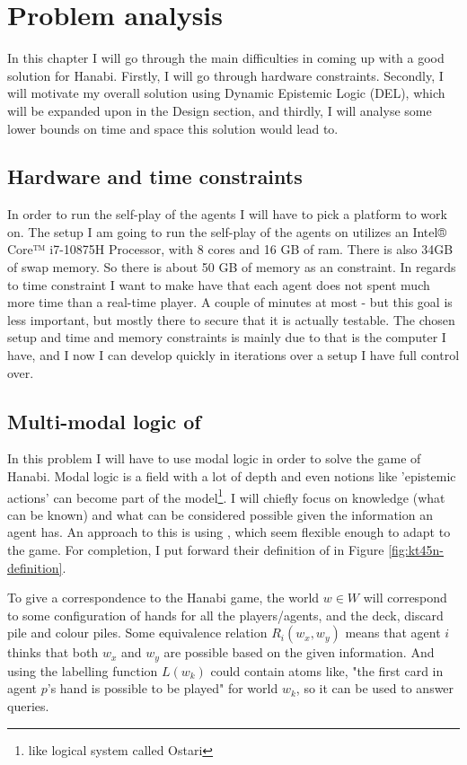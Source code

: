 \section{Problem analysis}

In this chapter I will go through the main difficulties in coming up with a good solution for Hanabi. Firstly, I will go through hardware constraints. Secondly, I will motivate my overall solution using Dynamic Epistemic Logic (DEL), which will be expanded upon in the Design section, and thirdly, I will analyse some lower bounds on time and space this solution would lead to.

\subsection{Hardware and time constraints}
In order to run the self-play of the agents I will have to pick a platform to work on.
The setup I am going to run the self-play of the agents on utilizes an Intel® Core™ i7-10875H Processor, with 8 cores and 16 GB of ram. There is also 34GB of swap memory. So there is about 50 GB of memory as an constraint.
In regards to time constraint I want to make have that each agent does not spent much more time than a real-time player. A couple of minutes at most - but this goal is less important, but mostly there to secure that it is actually testable.
The chosen setup and time and memory constraints is mainly due to that is the computer I have, and I now I can develop quickly in iterations over a setup I have full control over.

\subsection{Multi-modal logic of \SfiveN} \label{sec:definition-ktfourfiven}
In this problem I will have to use modal logic in order to solve the game of Hanabi. Modal logic is a field with a lot of depth and even notions like 'epistemic actions' can become part of the model\footnote{like \cite{EgerAndMartens17} logical system called Ostari}. I will chiefly focus on knowledge (what can be known) and what can be considered possible given the information an agent has. An approach to this is using \SfiveN{} \cite{HuthAndRyan2004KT45n}, which seem flexible enough to adapt to the game. For completion, I put forward their definition of \SfiveN{} in Figure \ref{fig:kt45n-definition}. 

To give a correspondence to the Hanabi game, the world $w \in W$ will correspond to some configuration of hands for all the players/agents, and the deck, discard pile and colour piles. Some equivalence relation $R_i(w_x,w_y)$ means that agent $i$ thinks that both $w_x$ and $w_y$ are possible based on the given information. And using the labelling function $L(w_k)$ could contain atoms like, "the first card in agent $p$'s hand is possible to be played" for world $w_k$, so it can be used to answer queries. 


